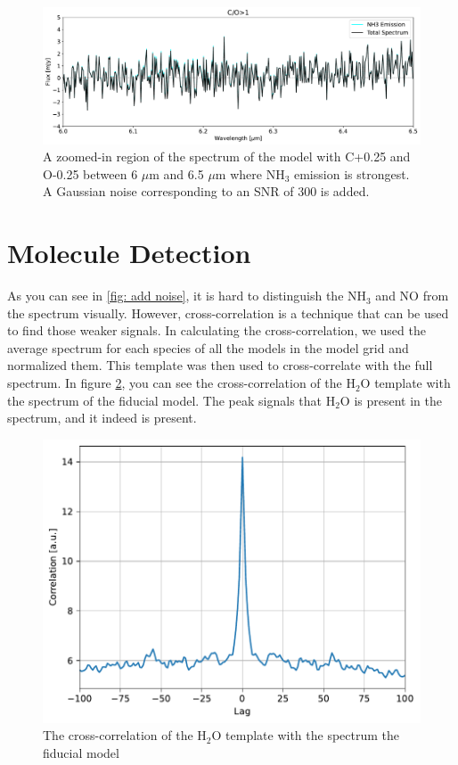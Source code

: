 \documentclass[oneside, single, authoryear, semicolon]{lion-msc}
\newcommand{\4}{$_4$}
\newcommand{\3}{$_3$}
\newcommand{\2}{$_2$}
\begin{document}
\begin{figure}[!ht]
    \centering
    \includegraphics[width=\linewidth]{Figures/AddNoise.pdf}
    \caption{A zoomed-in region of the spectrum of the model with C+0.25 and O-0.25 between 6 $\mu$m and 6.5 $\mu$m where NH\3 emission is strongest. A Gaussian noise corresponding to an SNR of 300 is added.}
    \label{fig: add noise}
\end{figure}

\section{Molecule Detection}
As you can see in \autoref{fig: add noise}, it is hard to distinguish the NH\3 and NO from the spectrum visually. However, cross-correlation is a technique that can be used to find those weaker signals. In calculating the cross-correlation, we used the average spectrum for each species of all the models in the model grid and normalized them. This template was then used to cross-correlate with the full spectrum. In figure \ref{fig: crosscorr}, you can see the cross-correlation of the H\2O template with the spectrum of the fiducial model. The peak signals that H\2O is present in the spectrum, and it indeed is present. 

\begin{figure}[!ht]
    \centering
    \includegraphics[width=\linewidth]{Figures/Cross-Correlation.pdf}
    \caption{The cross-correlation of the H\2O template with the spectrum the fiducial model}
    \label{fig: crosscorr}
\end{figure}
\end{document}
